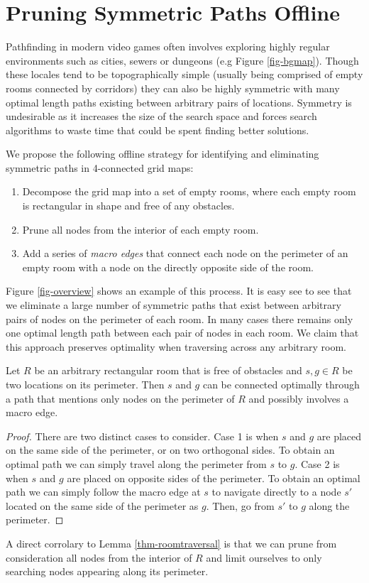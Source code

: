 \section{Pruning Symmetric Paths Offline}
\label{algorithm}
Pathfinding in modern video games often involves exploring highly regular 
environments such as cities, sewers or dungeons (e.g Figure \ref{fig-bgmap}).
Though these locales tend to be topographically simple (usually being comprised
of empty rooms connected by corridors) they can also be highly symmetric 
with many optimal length paths existing between arbitrary pairs of locations.
Symmetry is undesirable as it increases the size of the search space
and forces search algorithms to waste time that could be spent finding better solutions.
\par
We propose the following offline strategy for identifying and eliminating symmetric paths in 
4-connected grid maps:
\begin{enumerate}
\item{Decompose the grid map into a set of empty rooms, where each empty room is 
rectangular in shape and free of any obstacles.}
\item{Prune all nodes from the interior of each empty room.}
\item{Add a series of \emph{macro edges} that connect each node on the perimeter of an empty room
with a node on the directly opposite side of the room.}
\end{enumerate}
Figure \ref{fig-overview} shows an example of this process.
It is easy see to see that we eliminate a large number of symmetric paths
that exist between arbitrary pairs of nodes on the perimeter of each room.
In many cases there remains only one optimal length path between each 
pair of nodes in each room.
We claim that this approach preserves optimality when traversing across any arbitrary room.

\begin{lemma}
\label{thm-roomtraversal}
Let $R$ be an arbitrary rectangular room that is free of obstacles
and $s, g \in R$ be two locations on its perimeter.
Then $s$ and $g$ can be connected optimally through a path that
mentions only nodes on the perimeter of $R$ and possibly involves
a macro edge.
\end{lemma}
\begin{proof}
\par
There are two distinct cases to consider.
Case 1 is when $s$ and $g$ are placed on the same side of the perimeter, or
on two orthogonal sides. 
To obtain an optimal path we can simply travel along the perimeter from $s$ to $g$.
Case 2 is when $s$ and $g$ are placed on opposite sides of the perimeter.
To obtain an optimal path we can simply follow the macro edge at $s$ 
to navigate directly to a node $s'$ located on
the same side of the perimeter as $g$. Then, go from $s'$ to $g$ along the perimeter.
\end{proof}

A direct corrolary to Lemma \ref{thm-roomtraversal} is that we can prune from consideration
all nodes from the interior of $R$ and limit ourselves to only searching nodes appearing along its perimeter.
